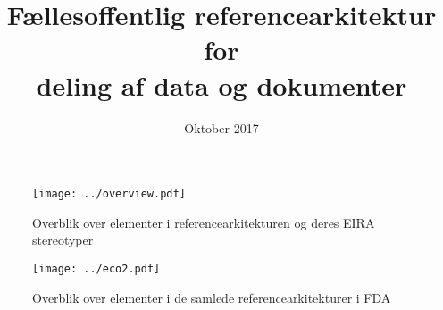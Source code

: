 \documentclass[10pt]{article}
\title{Fællesoffentlig referencearkitektur for \\ deling af data og dokumenter}
\author{}
\date{Oktober 2017}
\begin{document}
\maketitle \clearpage

\tableofcontents
\newpage




\newpage
\thispagestyle{empty}
\begin{figure}
\centering
\texttt{[image: ../overview.pdf]}
\caption{Overblik over elementer i referencearkitekturen og deres EIRA stereotyper}
\end{figure}

\newpage
\thispagestyle{empty}
\begin{figure}
\centering
\texttt{[image: ../eco2.pdf]}
\caption{Overblik over elementer i de samlede referencearkitekturer i FDA}
\end{figure}
\end{document}
